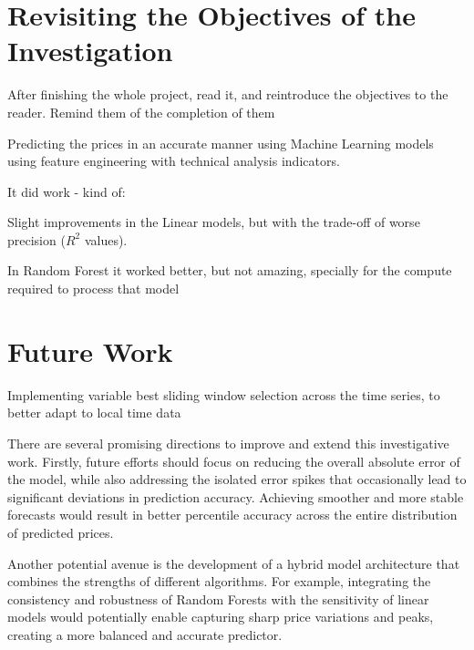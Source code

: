 \documentclass[12pt]{report} %
\begin{document}

\section{Revisiting the Objectives of the Investigation} %
After finishing the whole project, read it, and reintroduce the objectives to the reader. Remind them of the completion of them

Predicting the prices in an accurate manner using Machine Learning models using feature engineering with technical analysis indicators.

It did work - kind of:

Slight improvements in the Linear models, but with the trade-off of worse precision ($R^2$ values).

In Random Forest it worked better, but not amazing, specially for the compute required to process that model


\section{Future Work}

Implementing variable best sliding window selection across the time series, to better adapt to local time data

There are several promising directions to improve and extend this investigative work. Firstly, future efforts should focus on reducing the overall absolute error of the model, while also addressing the isolated error spikes that occasionally lead to significant deviations in prediction accuracy. Achieving smoother and more stable forecasts would result in better percentile accuracy across the entire distribution of predicted prices.

Another potential avenue is the development of a hybrid model architecture that combines the strengths of different algorithms. For example, integrating the consistency and robustness of Random Forests with the sensitivity of linear models would potentially enable capturing sharp price variations and peaks, creating a more balanced and accurate predictor.
\end{document}
